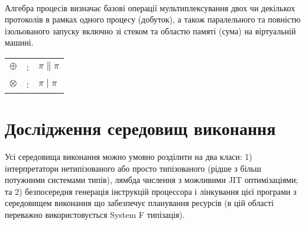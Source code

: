 \begin{prooftree}
\end{prooftree}

\begin{prooftree}
\end{prooftree}

\begin{prooftree}
\end{prooftree}
\paragraph{}

    \paragraph{}
    Алгебра процесів визначає базові операції мультиплексування двох чи декількох
    протоколів в рамках одного процесу (добуток), а також паралельного та повністю
    ізольованого запуску включно зі стеком та областю памяті (сума) на
    віртуальній машині.

\begin{center}
\begin{tabular}{lcl}
$\oplus$   &:& $\pi \parallel \pi$\\
$\otimes$  &:& $\pi \mid \pi$\\
\end{tabular}
\end{center}

\newpage
\section{Дослідження середовищ виконання}

Усі середовища виконання можно умовно розділити на два класи:
1) інтерпретатори нетипізованого або просто
типізованого (рідше з більш потужними системами типів),
лямбда числення з можливими JIT оптимізаціями; та 2)
безпосередня генерація інструкцій процессора і лінкування цієї програми з
середовищем виконання що забезпечує планування ресурсів
(в цій області переважно використовується System F типізація).

